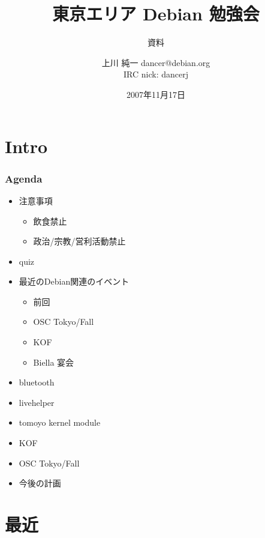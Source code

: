 \documentclass[cjk,dvipdfmx,12pt]{beamer}
\title{東京エリア Debian 勉強会}
\subtitle{資料}
\author{上川 純一 dancer@debian.org\\IRC nick: dancerj}
\date{2007年11月17日}
\begin{document}
\frame{\titlepage{}}

\section{Intro}

\begin{frame}
 \frametitle{Agenda}
\begin{minipage}[t]{0.45\hsize}
  \begin{itemize}
  \item 注意事項
	\begin{itemize}
	 \item 飲食禁止
	 \item 政治/宗教/営利活動禁止
	\end{itemize}
  \item quiz
  \item 最近のDebian関連のイベント
	\begin{itemize}
	 \item 前回
	 \item OSC Tokyo/Fall
	 \item KOF
	 \item Biella 宴会
	\end{itemize}
 \end{itemize}
\end{minipage}
\begin{minipage}[t]{0.45\hsize}
 \begin{itemize}
  \item bluetooth
  \item livehelper
  \item tomoyo kernel module
  \item KOF
  \item OSC Tokyo/Fall
  \item 今後の計画
 \end{itemize}
\end{minipage}
\end{frame}

\section{最近}
\end{document}
